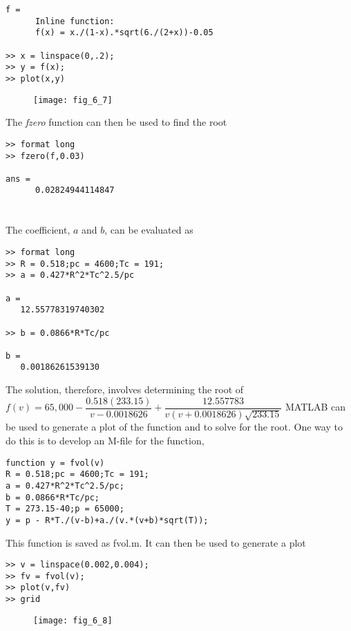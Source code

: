 \documentclass[../main.tex]{subfiles}
\begin{document}
\begin{enumerate}[label=\bfseries(\alph*)]
\begin{lstlisting}[numbers=none]
f =
	  Inline function:
 	  f(x) = x./(1-x).*sqrt(6./(2+x))-0.05
 
>> x = linspace(0,.2);
>> y = f(x);
>> plot(x,y) 
\end{lstlisting}
\bigbreak
\begin{figure}[H]
		\texttt{[image: fig\_6\_7]}
		\label{fig:fig_6_7}
	\end{figure}
	\bigbreak

\bigbreak
The \textit{fzero} function can then be used to find the root
\bigbreak


\begin{lstlisting}[numbers=none]
>> format long
>> fzero(f,0.03)

ans =
	  0.02824944114847
\end{lstlisting}

\bigbreak
\section{}
The coefficient, $a$ and $b$, can be evaluated as
\begin{lstlisting}[numbers=none]
>> format long
>> R = 0.518;pc = 4600;Tc = 191;
>> a = 0.427*R^2*Tc^2.5/pc

a =
   12.55778319740302
 
>> b = 0.0866*R*Tc/pc

b =
   0.00186261539130
\end{lstlisting}
\bigbreak
The solution, therefore, involves determining the root of
\bigbreak
$f(v)=65,000-\dfrac{0.518(233.15)}{v-0.0018626}+\dfrac{12.557783}{v(v+0.0018626) \sqrt{233.15}}$
\bigbreak
MATLAB can be used to generate a plot of the function and to solve for the root. One way to do this is to develop an M-file for the function,
\bigbreak
\begin{lstlisting}[numbers=none]
function y = fvol(v)
R = 0.518;pc = 4600;Tc = 191;
a = 0.427*R^2*Tc^2.5/pc;
b = 0.0866*R*Tc/pc;
T = 273.15-40;p = 65000;
y = p - R*T./(v-b)+a./(v.*(v+b)*sqrt(T));
\end{lstlisting}
\bigbreak
This function is saved as fvol.m. It can then be used to generate a plot
\bigbreak
\begin{lstlisting}[numbers=none]
>> v = linspace(0.002,0.004);
>> fv = fvol(v);
>> plot(v,fv)
>> grid
\end{lstlisting}
\bigbreak
\begin{figure}[H]
		\hspace*{0.8cm}\texttt{[image: fig\_6\_8]}
		\label{fig:fig_6_8}
	\end{figure}
	\bigbreak


\end{enumerate}
\end{document}
